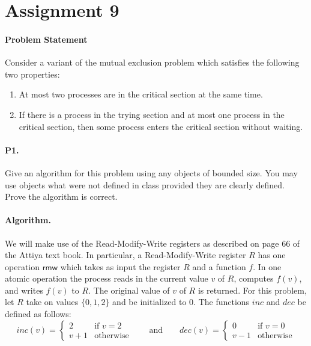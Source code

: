 \documentclass[11pt]{article}
\newcommand\rmw{\mathsf{rmw}}
\begin{document}
\rhead{\today}

\section*{Assignment 9}
\paragraph{Problem Statement}
Consider a variant of the mutual exclusion problem which satisfies the following two properties:
\begin{enumerate}
\item At most two processes are in the critical section at the same time.
\item If there is a process in the trying section and at most one process in the critical section, then some process enters the critical section without waiting.
\end{enumerate}

\paragraph{P1.} Give an algorithm for this problem using any objects of bounded size. You may use objects what were not defined in class provided they are clearly defined. Prove the algorithm is correct. 
\paragraph{Algorithm.} We will make use of the Read-Modify-Write registers as described on page 66 of the Attiya text book. In particular, a Read-Modify-Write register $R$ has one operation $\rmw$ which takes as input the register $R$ and a function $f$. In one atomic operation the process reads in the current value $v$ of $R$, computes $f(v)$, and writes $f(v)$ to $R$. The original value of $v$ of $R$ is returned. For this problem, let $R$ take on values $\{0,1,2\}$ and be initialized to $0$. The functions $inc$ and $dec$ be defined as follows:
\[inc(v) = \begin{cases}
2 &\mbox{if } v = 2\\
v+1 &\mbox{otherwise}
\end{cases} \qquad\mbox{and}\qquad 
dec(v) = \begin{cases}
0 &\mbox{if } v = 0\\
v-1 &\mbox{otherwise}
\end{cases}\] 
\end{document}
